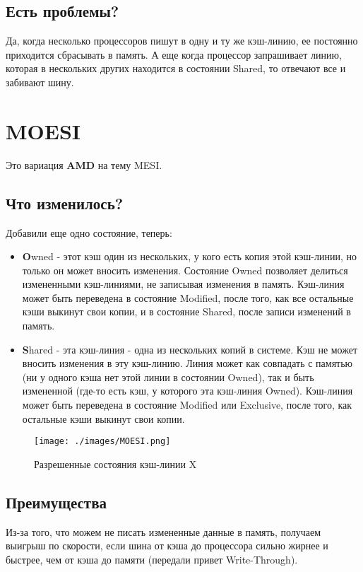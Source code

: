\documentclass[12pt, a4paper]{article}
\begin{document}
\subsection{Есть проблемы?}
Да, когда несколько процессоров пишут в одну и ту же кэш-линию, ее постоянно приходится сбрасывать в память.
А еще когда процессор запрашивает линию, которая в нескольких других находится в состоянии Shared, то отвечают все и забивают шину.
\section{MOESI}
Это вариация \textbf{AMD} на тему MESI.
\subsection{Что изменилось?}
Добавили еще одно состояние, теперь:
\begin{itemize}
    \item \textbf{O}wned - этот кэш один из нескольких, у кого есть копия этой кэш-линии, но только он может вносить изменения. Состояние Owned позволяет делиться измененными кэш-линиями, не записывая изменения в память. Кэш-линия может быть переведена в состояние Modified, после того, как все остальные кэши выкинут свои копии, и в состояние Shared, после записи изменений в память.
    \item \textbf{S}hared - эта кэш-линия - одна из нескольких копий в системе. Кэш не может вносить изменения в эту кэш-линию. Линия может как совпадать с памятью (ни у одного кэша нет этой линии в состоянии Owned), так и быть измененной (где-то есть кэш, у которого эта кэш-линия Owned). Кэш-линия может быть переведена в состояние Modified или Exclusive, после того, как остальные кэши выкинут свои копии.
\end{itemize}
\begin{figure}[h]
    \centering
    \texttt{[image: ./images/MOESI.png]}
    \caption{Разрешенные состояния кэш-линии X}
    \label{fig:MOESI}
\end{figure}
\subsection{Преимущества}
Из-за того, что можем не писать измененные данные в память, получаем выигрыш по скорости, если шина от кэша до процессора сильно жирнее и быстрее, чем от кэша до памяти (передали привет Write-Through).
\end{document}
